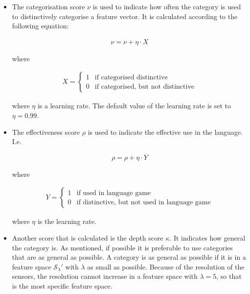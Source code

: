\begin{itemize}
\item The categorisation score $\nu$ is used to indicate how often the category is used to distinctively categorise a feature vector. It is calculated according to the following equation:

\begin{eqnarray}
\nu = \nu + \eta \cdot X
\label{e:lg:nu}
\end{eqnarray}

where

\begin{eqnarray}
X = \left \{ \begin{array}{rl}
1 & \mbox{if categorised distinctive}\\\nonumber
0 & \mbox{if categorised, but not distinctive}\nonumber
\end{array} \right.
\end{eqnarray}


where $\eta$ is a learning rate. The default value of the learning rate is set to $\eta=0.99$.

\item The effectiveness score $\rho$ is used to indicate the effective use in the language. I.e.

\begin{eqnarray}
\rho = \rho + \eta \cdot Y
\label{e:lg:rho}
\end{eqnarray}

where

\begin{eqnarray}
Y = \left \{ \begin{array}{rl}
1 & \mbox{if used in language game}\\\nonumber
0 & \mbox{if distinctive, but not used in language game}\nonumber
\end{array} \right.
\end{eqnarray}


where $\eta$ is the learning rate.

\item Another score that is calculated is the depth score $\kappa$. It indicates how general the category is. As mentioned, if possible it is preferable to use categories that are as general as possible. A category is as general as possible if it is in a feature space ${\mathcal S}_\lambda'$ with $\lambda$ as small as possible. Because of the resolution of the sensors, the resolution cannot increase in a feature space with $\lambda=5$, so that is the most specific feature space.


\end{itemize}
